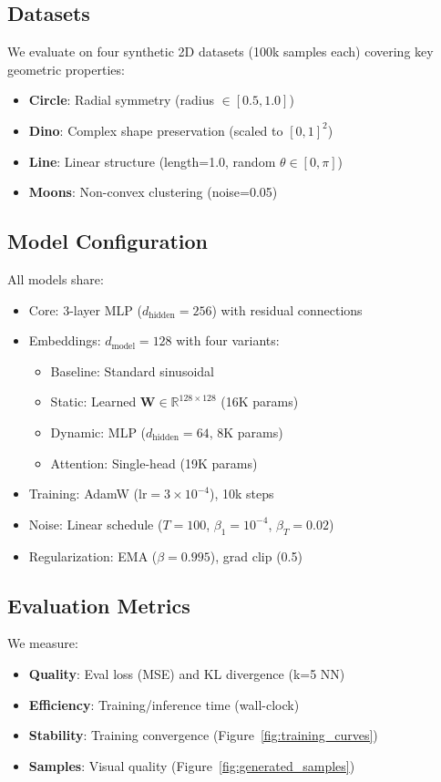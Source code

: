 \documentclass{article} %
\begin{document}
\subsection{Datasets}
We evaluate on four synthetic 2D datasets (100k samples each) covering key geometric properties:
\begin{itemize}
    \item \textbf{Circle}: Radial symmetry (radius $\in[0.5,1.0]$)
    \item \textbf{Dino}: Complex shape preservation (scaled to $[0,1]^2$)
    \item \textbf{Line}: Linear structure (length=1.0, random $\theta\in[0,\pi]$)
    \item \textbf{Moons}: Non-convex clustering (noise=0.05)
\end{itemize}

\subsection{Model Configuration}
All models share:
\begin{itemize}
    \item Core: 3-layer MLP ($d_{\text{hidden}}=256$) with residual connections
    \item Embeddings: $d_{\text{model}}=128$ with four variants:
    \begin{itemize}
        \item Baseline: Standard sinusoidal \citep{ddpm}
        \item Static: Learned $\mathbf{W}\in\mathbb{R}^{128\times128}$ (16K params)
        \item Dynamic: MLP ($d_{\text{hidden}}=64$, 8K params)
        \item Attention: Single-head (19K params)
    \end{itemize}
    \item Training: AdamW ($\text{lr}=3\times10^{-4}$), 10k steps
    \item Noise: Linear schedule ($T=100$, $\beta_1=10^{-4}$, $\beta_T=0.02$)
    \item Regularization: EMA ($\beta=0.995$), grad clip (0.5)
\end{itemize}

\subsection{Evaluation Metrics}
We measure:
\begin{itemize}
    \item \textbf{Quality}: Eval loss (MSE) and KL divergence (k=5 NN)
    \item \textbf{Efficiency}: Training/inference time (wall-clock)
    \item \textbf{Stability}: Training convergence (Figure~\ref{fig:training_curves})
    \item \textbf{Samples}: Visual quality (Figure~\ref{fig:generated_samples})
\end{itemize}
\end{document}

